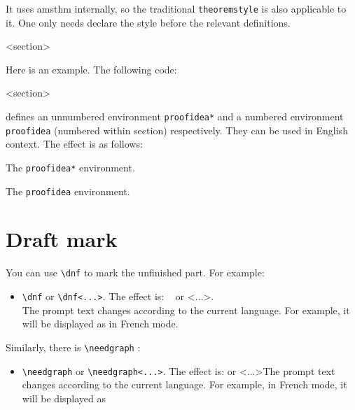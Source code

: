 \documentclass{simplivre}
\newenvironment{remind}[1][Remind]{%
    \LocallyStopLineNumbers%
    \begin{tcolorbox}[breakable,
        enhanced,
        width = \textwidth,
        colback = white, colbacktitle = paper,
        colframe = gray!50, boxrule=0.2mm,
        coltitle = black,
        fonttitle = \sffamily,
        attach boxed title to top left = {yshift=-\tcboxedtitleheight/2,  xshift=\tcboxedtitlewidth/4},
        boxed title style = {boxrule=0pt, colframe=paper},
        before skip = 0.3cm,
        after skip = 0.3cm,
        top = 3mm,
        bottom = 3mm,
        title={\sffamily #1}]%
}{\end{tcolorbox}\ResumeLineNumbers}
\begin{document}
\begin{remind}
    It uses \textsf{amsthm} internally, so the traditional \texttt{theoremstyle} is also applicable to it. One only needs declare the style before the relevant definitions.
\end{remind}

<section>

\bigskip
Here is an example. The following code:

\begin{code}
  <section>
\end{code}

defines an unnumbered environment \lstinline|proofidea*| and a numbered environment \lstinline|proofidea| (numbered within section) respectively. They can be used in English context. The effect is as follows:

\begin{proofidea*}
    The \lstinline|proofidea*| environment.
\end{proofidea*}

\begin{proofidea}
    The \lstinline|proofidea| environment.
\end{proofidea}

\clearpage
\section{Draft mark}

You can use \lstinline|\dnf| to mark the unfinished part. For example:
\begin{itemize}
    \item \lstinline|\dnf| or \lstinline|\dnf<...>|. The effect is: \dnf~ or \dnf<...>. \\The prompt text changes according to the current language. For example, it will be displayed as  in French mode.
\end{itemize}

Similarly, there is \lstinline|\needgraph| : 
\begin{itemize}
    \item \lstinline|\needgraph| or \lstinline|\needgraph<...>|. The effect is: \needgraph or \needgraph<...>The prompt text changes according to the current language. For example, in French mode, it will be displayed as 
\end{itemize}
\end{document}
